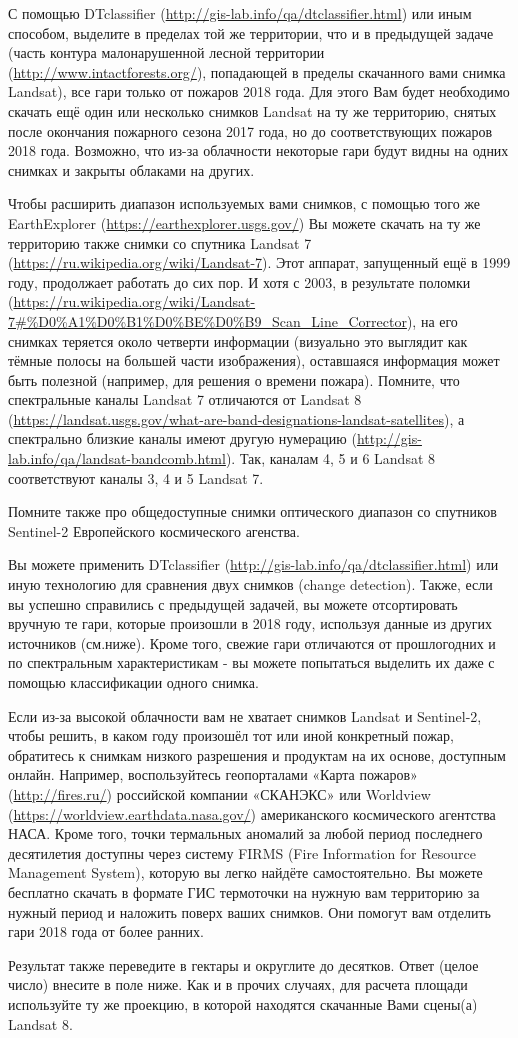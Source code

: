 
С помощью DTclassifier (\url{http://gis-lab.info/qa/dtclassifier.html}) или иным способом, выделите в пределах 
той же территории, что и в предыдущей задаче (часть контура малонарушенной лесной территории (\url{http://www.intactforests.org/}), 
попадающей в пределы скачанного вами снимка Landsat), все гари только от пожаров 2018 года. Для этого Вам будет необходимо скачать ещё один или несколько снимков Landsat на ту же территорию, снятых после окончания пожарного сезона 2017 года, но до соответствующих пожаров 2018 года. Возможно, что из-за облачности некоторые гари будут видны на одних снимках и закрыты облаками на других.

Чтобы расширить диапазон используемых вами снимков, с помощью того же EarthExplorer (\url{https://earthexplorer.usgs.gov/}) 
Вы можете скачать на ту же территорию также снимки со спутника Landsat 7 (\url{https://ru.wikipedia.org/wiki/Landsat-7}). 
Этот аппарат, запущенный ещё в 1999 году, продолжает работать до сих пор. И хотя с 2003, в результате поломки (\url{https://ru.wikipedia.org/wiki/Landsat-7#%D0%A1%D0%B1%D0%BE%D0%B9_Scan_Line_Corrector}), 
на его снимках теряется около четверти информации (визуально это выглядит как тёмные полосы на 
большей части изображения), оставшаяся информация может быть полезной (например, для решения о времени пожара). 
Помните, что спектральные каналы Landsat 7 отличаются от Landsat 8 (\url{https://landsat.usgs.gov/what-are-band-designations-landsat-satellites}), 
а спектрально близкие каналы имеют другую нумерацию (\url{http://gis-lab.info/qa/landsat-bandcomb.html}). Так, каналам 4, 5 и 6 Landsat 8 соответствуют каналы 3, 4 и 5 Landsat 7.

Помните также про общедоступные снимки оптического диапазон со спутников Sentinel-2 Европейского космического агенства. 

Вы можете применить DTclassifier (\url{http://gis-lab.info/qa/dtclassifier.html}) или иную технологию для 
сравнения двух снимков (change detection). Также, если вы успешно справились с предыдущей задачей, вы можете отсортировать вручную те гари, которые произошли в 2018 году, используя данные из других источников (см.ниже). Кроме того, свежие гари отличаются от прошлогодних и по спектральным характеристикам - вы можете попытаться выделить их даже с помощью классификации одного снимка.

Если из-за высокой облачности вам не хватает снимков Landsat и Sentinel-2, 
чтобы решить, в каком году произошёл тот или иной конкретный пожар, обратитесь к 
снимкам низкого разрешения и продуктам на их основе, доступным онлайн. Например, 
воспользуйтесь геопорталами «Карта пожаров» (\url{http://fires.ru/}) российской компании «СКАНЭКС» или Worldview (\url{https://worldview.earthdata.nasa.gov/}) американского космического агентства НАСА. Кроме того, точки термальных аномалий за любой период последнего десятилетия доступны через систему FIRMS (Fire Information for Resource Management System), которую вы легко найдёте самостоятельно. Вы можете бесплатно скачать в формате ГИС термоточки на нужную вам территорию за нужный период и наложить поверх ваших снимков. Они помогут вам отделить гари 2018 года от более ранних.

Результат также переведите в гектары и округлите до десятков. Ответ (целое число) внесите в поле ниже.  Как и в прочих случаях, для расчета площади используйте ту же проекцию, в которой находятся скачанные Вами сцены(а) Landsat 8. 